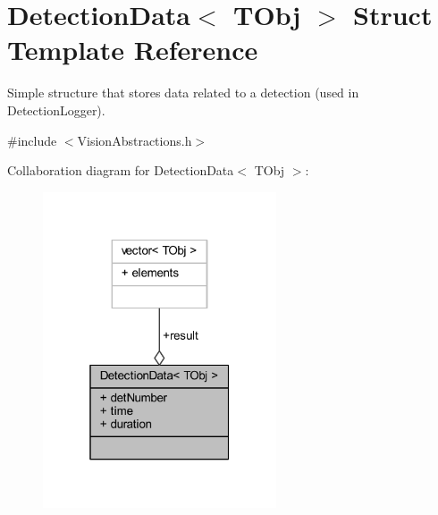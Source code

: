 \hypertarget{struct_vision_core_1_1_abstractions_1_1_detection_data}{}\section{Detection\+Data$<$ T\+Obj $>$ Struct Template Reference}
\label{struct_vision_core_1_1_abstractions_1_1_detection_data}


Simple structure that stores data related to a detection (used in Detection\+Logger).  




{\ttfamily \#include $<$Vision\+Abstractions.\+h$>$}



Collaboration diagram for Detection\+Data$<$ T\+Obj $>$\+:
\nopagebreak
\begin{figure}[H]
\begin{center}
\leavevmode
\includegraphics[width=196pt]{struct_vision_core_1_1_abstractions_1_1_detection_data__coll__graph}
\end{center}
\end{figure}
